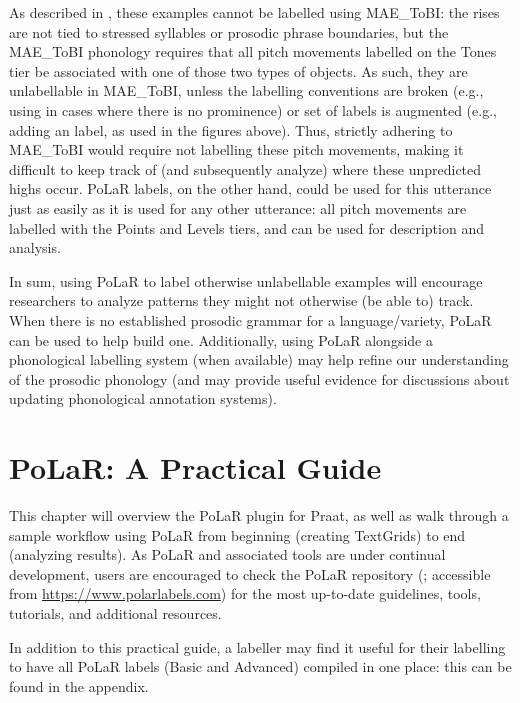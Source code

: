 \documentclass[11pt, twoside]{memoir}
\def\textlabel#1{{\relsize{-.5}\fontspec[Mapping=tex-text]{Roboto Mono}{#1}}}
\begin{document}
As described in \citealt{ahnzhou19}, these examples cannot be labelled using MAE\_ToBI: the rises are not tied to stressed syllables or prosodic phrase boundaries, but the MAE\_ToBI phonology requires that all pitch movements labelled on the Tones tier be associated with one of those two types of objects. As such, they are unlabellable in MAE\_ToBI, unless the labelling conventions are broken (e.g., using \textlabel{H*} in cases where there is no prominence) or set of labels is augmented (e.g., adding an \textlabel{h} label, as used in the figures above). Thus, strictly adhering to MAE\_ToBI would require not labelling these pitch movements, making it difficult to keep track of (and subsequently analyze) where these unpredicted highs occur. PoLaR labels, on the other hand, could be used for this utterance just as easily as it is used for any other utterance: all pitch movements are labelled with the Points and Levels tiers, and can be used for description and analysis.

In sum, using PoLaR to label otherwise unlabellable examples will encourage researchers to analyze patterns they might not otherwise (be able to) track. When there is no established prosodic grammar for a language\slash variety, PoLaR can be used to help build one. Additionally, using PoLaR alongside a phonological labelling system (when available) may help refine our understanding of the prosodic phonology (and may provide useful evidence for discussions about updating phonological annotation systems).







\chapter{PoLaR: A Practical Guide}\label{ch:practical}

This chapter will overview the PoLaR plugin for Praat, as well as walk through a sample workflow using PoLaR from beginning (creating TextGrids) to end (analyzing results). As PoLaR and associated tools are under continual development, users are encouraged to check the PoLaR repository (\citealt{ahn-21}; accessible from \href{https://www.polarlabels.com}{https://www.polarlabels.com}) for the most up-to-date guidelines, tools, tutorials, and additional resources.

In addition to this practical guide, a labeller may find it useful for their labelling to have all PoLaR labels (Basic and Advanced) compiled in one place: this can be found in the appendix.
\end{document}
